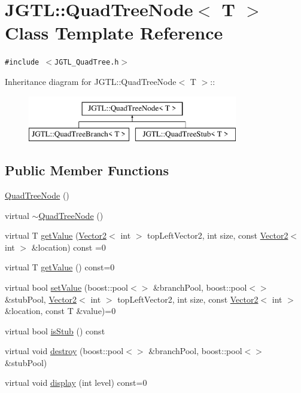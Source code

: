 \hypertarget{class_j_g_t_l_1_1_quad_tree_node}{
\section{JGTL::Quad\-Tree\-Node$<$ T $>$ Class Template Reference}
\label{class_j_g_t_l_1_1_quad_tree_node}
}
{\tt \#include $<$JGTL\_\-Quad\-Tree.h$>$}

Inheritance diagram for JGTL::Quad\-Tree\-Node$<$ T $>$::\begin{figure}[H]
\begin{center}
\leavevmode
\includegraphics[height=2cm]{class_j_g_t_l_1_1_quad_tree_node}
\end{center}
\end{figure}
\subsection*{Public Member Functions}
\begin{CompactItemize}
\item 
\hyperlink{class_j_g_t_l_1_1_quad_tree_node_7783c0e4e2c9e62c843e0b00dbb45931}{Quad\-Tree\-Node} ()
\item 
virtual \hyperlink{class_j_g_t_l_1_1_quad_tree_node_a21e240bd8cc15ffd970880b314e7183}{$\sim$Quad\-Tree\-Node} ()
\item 
virtual T \hyperlink{class_j_g_t_l_1_1_quad_tree_node_bc249b527b146888c21dac71783f42b6}{get\-Value} (\hyperlink{class_j_g_t_l_1_1_vector2}{Vector2}$<$ int $>$ top\-Left\-Vector2, int size, const \hyperlink{class_j_g_t_l_1_1_vector2}{Vector2}$<$ int $>$ \&location) const =0
\item 
virtual T \hyperlink{class_j_g_t_l_1_1_quad_tree_node_b92e9755284317f2d8102f028b0481c7}{get\-Value} () const=0
\item 
virtual bool \hyperlink{class_j_g_t_l_1_1_quad_tree_node_8bf383a824c1b5dc7dc2fff05aeaaec9}{set\-Value} (boost::pool$<$$>$ \&branch\-Pool, boost::pool$<$$>$ \&stub\-Pool, \hyperlink{class_j_g_t_l_1_1_vector2}{Vector2}$<$ int $>$ top\-Left\-Vector2, int size, const \hyperlink{class_j_g_t_l_1_1_vector2}{Vector2}$<$ int $>$ \&location, const T \&value)=0
\item 
virtual bool \hyperlink{class_j_g_t_l_1_1_quad_tree_node_bdc8677d8f2d61e8e7bbe31922b1899f}{is\-Stub} () const
\item 
virtual void \hyperlink{class_j_g_t_l_1_1_quad_tree_node_c73b9973bed0498532647bd3ebfdaddb}{destroy} (boost::pool$<$$>$ \&branch\-Pool, boost::pool$<$$>$ \&stub\-Pool)
\item 
virtual void \hyperlink{class_j_g_t_l_1_1_quad_tree_node_5d3e714f007be6a1ab507bcda173aede}{display} (int level) const=0
\end{CompactItemize}
